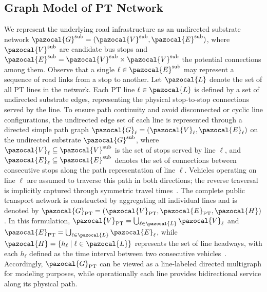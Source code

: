\documentclass[a4paper,fleqn]{cas-sc}
\begin{document}
\subsection{Graph Model of PT Network}\label{sec:graphMODEL}
We represent the underlying road infrastructure as an undirected
substrate network $\pazocal{G}^{\text{sub}} = (\pazocal{V}^{\text{sub}}, \pazocal{E}^{\text{sub}})$, where $\pazocal{V}^{\text{sub}}$ are candidate bus stops and $\pazocal{E}^{\text{sub}} = \pazocal{V}^{\text{sub}} \times \pazocal{V}^{\text{sub}}$ the potential connections among them. Observe that a single $\ell \in \pazocal{E}^{\text{sub}}$ may represent a sequence of road links from a stop to another.
Let $\pazocal{L}$ denote the set of all PT lines in the network.
Each PT line $\ell \in \pazocal{L}$ is defined by a set of undirected substrate edges, representing the physical stop-to-stop connections served by the line.
To ensure path continuity and avoid disconnected or cyclic line configurations, the undirected edge set of each line is represented through a directed simple path graph $\pazocal{G}_\ell = (\pazocal{V}_\ell, \pazocal{E}_\ell)$ on the undirected substrate $\pazocal{G}^{\text{sub}}$,
where $\pazocal{V}_\ell \subseteq \pazocal{V}^{\text{sub}}$ is the set of stops served by line $\ell$, and $\pazocal{E}_\ell \subseteq \pazocal{E}^{\text{sub}}$ denotes the set of connections between consecutive stops along the path representation of line $\ell$.
\label{sentence:line-in-one-direction}
Vehicles operating on line $\ell$ are assumed to traverse this path in both directions; the reverse traversal is implicitly captured through symmetric travel times~\citep{schmid2014hybrid}.
%
The complete public transport network is constructed by aggregating all individual lines and is denoted by $\pazocal{G}_{\text{PT}} = (\pazocal{V}_{\text{PT}}, \pazocal{E}_{\text{PT}}, \pazocal{H})$.
In this formulation, $\pazocal{V}_{\text{PT}} = \bigcup_{\ell \in \pazocal{L}} \pazocal{V}_\ell$ and $\pazocal{E}_{\text{PT}} = \bigcup_{\ell \in \pazocal{L}} \pazocal{E}_\ell$, while $\pazocal{H} = \{h_\ell \mid \ell \in \pazocal{L}\}$ represents the set of line headways, with each $h_\ell$ defined as the time interval between two consecutive vehicles~\citep{vuchic1981timed}.
Accordingly, $\pazocal{G}_{\text{PT}}$ can be viewed as a line-labeled directed multigraph for modeling purposes, while operationally each line provides bidirectional service along its physical path.
\end{document}
